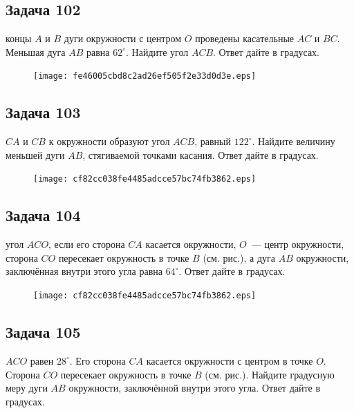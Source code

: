 \documentclass[a4paper,10pt]{article} %
\begin{document}
\begin{spacing}{1.0}
{\subsection*{Задача 102}
 концы $A$ и $B$ дуги окружности с центром $O$ проведены касательные $AC$ и $BC$. Меньшая дуга $AB$ равна $62^\circ$. Найдите угол $ACB$. Ответ дайте в градусах.

\vspace{1.5cm}

\begin{figure}{\texttt{[image: fe46005cbd8c2ad26ef505f2e33d0d3e.eps]}}\end{figure}
\subsection*{Задача 103}
 $CA$ и $CB$ к окружности образуют угол $ACB$, равный $122^\circ$. Найдите величину меньшей дуги $AB$, стягиваемой точками касания. Ответ дайте в градусах.

\vspace{1.5cm}

\begin{figure}{\texttt{[image: cf82cc038fe4485adcce57bc74fb3862.eps]}}\end{figure}
\subsection*{Задача 104}
 угол $ACO$, если его сторона $CA$ касается окружности, $O$~--- центр окружности, сторона $CO$ пересекает окружность в точке $B$ (см. рис.), а дуга $AB$ окружности, заключённая внутри этого угла равна $64^\circ$. Ответ дайте в градусах.

\vspace{1.5cm}

\begin{figure}{\texttt{[image: cf82cc038fe4485adcce57bc74fb3862.eps]}}\end{figure}
\subsection*{Задача 105}
 $ACO$ равен $28^\circ$. Его сторона $CA$ касается окружности с центром в точке $O$. Сторона $CO$ пересекает окружность в точке $B$ (см. рис.). Найдите градусную меру дуги $AB$ окружности, заключённой внутри этого угла. Ответ дайте в градусах.

\vspace{1.5cm}

}
\end{spacing}
\end{document}
